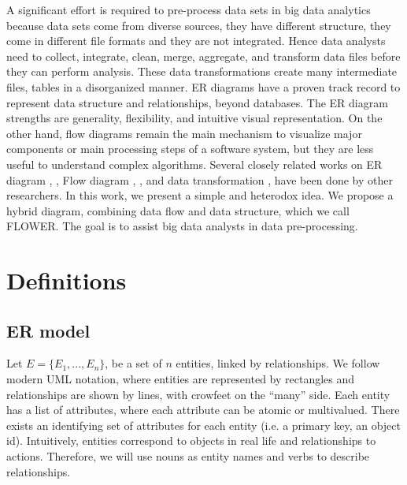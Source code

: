 \documentclass[sigconf,edbt]{acmart-edbt-workshops}
\newcommand{\+}{\discretionary{\mbox{${\bm\cdot}\mkern-1mu$}}{}{}}
\begin{document}
A significant effort is required to pre-process data sets in big data analytics
because data sets come from diverse sources, they have different structure,
they come in different file formats and they are not integrated.
Hence data analysts need to collect, integrate, clean, merge, aggregate, and transform data files
before they can perform analysis. 
These data transformations create many intermediate files, tables in a disorganized manner. 
ER diagrams have a proven track record to represent data structure and relationships, beyond databases. 
The ER diagram strengths are generality, flexibility, and intuitive visual representation. 
On the other hand, flow diagrams remain the main mechanism to visualize major components or main processing steps of a software system, but they are less useful to understand complex algorithms.
Several closely related works on ER diagram \cite{MCHM2014}, \cite{Guo2018}, Flow diagram \cite{BNT1986}, \cite{WADHR2005}, and data transformation \cite{SVBS2016}, \cite{PKJ2019} have been done by other researchers.
In this work, 
we present a simple and heterodox idea.
%
We propose a hybrid diagram, 
combining data flow and data structure,
which we call FLOWER.
The goal is to assist big data analysts in data pre-processing.%



\section{Definitions}

\subsection{ER model}

Let $E=\{E_1,...,E_n\}$, be a set of $n$ entities, linked by relationships.
We follow modern UML notation, where entities are represented by rectangles
and relationships are shown by lines, with crowfeet on the ``many'' side.
Each entity has a list of attributes, where each attribute can be atomic or multivalued.
There exists an identifying set of attributes for each entity (i.e. a primary key, an object id).
Intuitively, entities correspond to objects in real life
and relationships to actions.
Therefore, we will use nouns as entity names and verbs to describe relationships.
\end{document}
